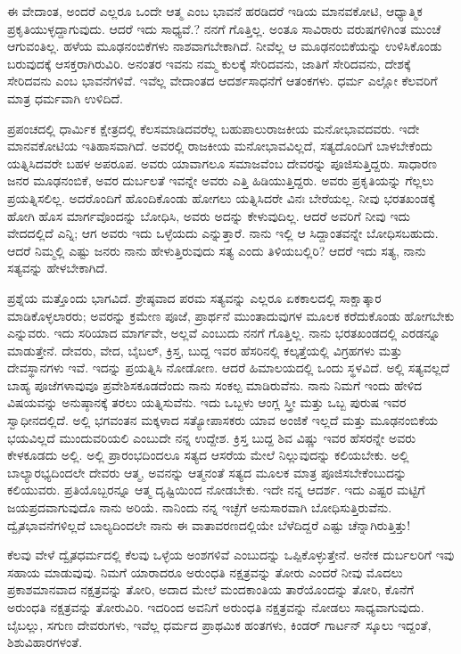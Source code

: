 ಈ ವೇದಾಂತ, ಅಂದರೆ ಎಲ್ಲರೂ ಒಂದೇ ಆತ್ಮ ಎಂಬ ಭಾವನೆ ಹರಡಿದರೆ ಇಡಿಯ ಮಾನವಕೋಟಿ, ಆಧ್ಯಾತ್ಮಿಕ ಪ್ರಕೃತಿಯುಳ್ಳದ್ದಾಗುವುದು. ಆದರೆ ಇದು ಸಾಧ್ಯವೆ.? ನನಗೆ ಗೊತ್ತಿಲ್ಲ. ಅಂತೂ ಸಾವಿರಾರು ವರುಷಗಳಿಗಿಂತ ಮುಂಚೆ ಆಗುವಂತಿಲ್ಲ. ಹಳೆಯ ಮೂಢನಂಬಿಕೆಗಳು ನಾಶವಾಗಬೇಕಾಗಿದೆ. ನೀವೆಲ್ಲ ಆ ಮೂಢನಂಬಿಕೆಯನ್ನು ಉಳಿಸಿಕೊಂಡು ಬರುವುದಕ್ಕೆ ಆಸಕ್ತರಾಗಿರುವಿರಿ. ಅನಂತರ ಇವನು ನಮ್ಮ ಕುಲಕ್ಕೆ ಸೇರಿದವನು, ಜಾತಿಗೆ ಸೇರಿದವನು, ದೇಶಕ್ಕೆ ಸೇರಿದವನು ಎಂಬ ಭಾವನೆಗಳಿವೆ. ಇವೆಲ್ಲ ವೇದಾಂತದ ಆದರ್ಶಸಾಧನೆಗೆ ಆತಂಕಗಳು. ಧರ್ಮ ಎಲ್ಲೋ ಕೆಲವರಿಗೆ ಮಾತ್ರ ಧರ್ಮವಾಗಿ ಉಳಿದಿದೆ.

\newpage

ಪ್ರಪಂಚದಲ್ಲಿ ಧಾರ್ಮಿಕ ಕ್ಷೇತ್ರದಲ್ಲಿ ಕೆಲಸಮಾಡಿದವರೆಲ್ಲ ಬಹುಪಾಲು\break ರಾಜಕೀಯ ಮನೋಭಾವದವರು. ಇದೇ ಮಾನವಕೋಟಿಯ ಇತಿಹಾಸವಾಗಿದೆ. ಅವರಲ್ಲಿ ರಾಜಕೀಯ ಮನೋಭಾವವಿಲ್ಲದೆ, ಸತ್ಯದೊಂದಿಗೆ ಬಾಳಬೇಕೆಂದು ಯತ್ನಿಸಿದವರೇ ಬಹಳ ಅಪರೂಪ. ಅವರು ಯಾವಾಗಲೂ ಸಮಾಜವೆಂಬ ದೇವರನ್ನು ಪೂಜಿಸುತ್ತಿದ್ದರು. ಸಾಧಾರಣ ಜನರ ಮೂಢನಂಬಿಕೆ, ಅವರ ದುರ್ಬಲತೆ ಇವನ್ನೇ ಅವರು ಎತ್ತಿ ಹಿಡಿಯುತ್ತಿದ್ದರು. ಅವರು ಪ್ರಕೃತಿಯನ್ನು ಗೆಲ್ಲಲು ಪ್ರಯತ್ನಿಸಲಿಲ್ಲ. ಅದರೊಂದಿಗೆ ಹೊಂದಿಕೊಂಡು ಹೋಗಲು ಯತ್ನಿಸಿದರೇ ವಿನಃ ಬೇರೆಯಲ್ಲ. ನೀವು ಭರತಖಂಡಕ್ಕೆ ಹೋಗಿ ಹೊಸ ಮಾರ್ಗವೊಂದನ್ನು ಬೋಧಿಸಿ, ಅವರು ಅದನ್ನು ಕೇಳುವುದಿಲ್ಲ. ಆದರೆ ಅವರಿಗೆ ನೀವು ಇದು ವೇದದಲ್ಲಿದೆ ಎನ್ನಿ; ಆಗ ಅವರು ಇದು ಒಳ್ಳೆಯದು ಎನ್ನುತ್ತಾರೆ. ನಾನು ಇಲ್ಲಿ ಆ ಸಿದ್ದಾಂತವನ್ನೇ ಬೋಧಿಸಬಹುದು. ಆದರೆ ನಿಮ್ಮಲ್ಲಿ ಎಷ್ಟು ಜನರು ನಾನು ಹೇಳುತ್ತಿರುವುದು ಸತ್ಯ ಎಂದು ತಿಳಿಯಬಲ್ಲಿರಿ? ಆದರೆ ಇದು ಸತ್ಯ, ನಾನು ಸತ್ಯವನ್ನು ಹೇಳಬೇಕಾಗಿದೆ.

ಪ್ರಶ್ನೆಯ ಮತ್ತೊಂದು ಭಾಗವಿದೆ. ಶ್ರೇಷ್ಠವಾದ ಪರಮ ಸತ್ಯವನ್ನು ಎಲ್ಲರೂ ಏಕಕಾಲದಲ್ಲಿ ಸಾಕ್ಷಾತ್ಕಾರ ಮಾಡಿಕೊಳ್ಳಲಾರರು; ಅವರನ್ನು ಕ್ರಮೇಣ ಪೂಜೆ, ಪ್ರಾರ್ಥನೆ ಮುಂತಾದುವುಗಳ ಮೂಲಕ ಕರೆದುಕೊಂಡು ಹೋಗಬೇಕು ಎನ್ನುವರು. ಇದು ಸರಿಯಾದ ಮಾರ್ಗವೇ, ಅಲ್ಲವೆ ಎಂಬುದು ನನಗೆ ಗೊತ್ತಿಲ್ಲ. ನಾನು ಭರತಖಂಡದಲ್ಲಿ ಎರಡನ್ನೂ ಮಾಡುತ್ತೇನೆ. ದೇವರು, ವೇದ, ಬೈಬಲ್, ಕ್ರಿಸ್ತ, ಬುದ್ದ ಇವರ ಹೆಸರಿನಲ್ಲಿ ಕಲ್ಕತ್ತೆಯಲ್ಲಿ ವಿಗ್ರಹಗಳು ಮತ್ತು ದೇವಸ್ಥಾನಗಳು ಇವೆ. ಇದನ್ನು ಪ್ರಯತ್ನಿಸಿ ನೋಡೋಣ. ಆದರೆ ಹಿಮಾಲಯದಲ್ಲಿ ಒಂದು ಸ್ಥಳವಿದೆ. ಅಲ್ಲಿ ಸತ್ಯವಲ್ಲದೆ ಬಾಹ್ಯ ಪೂಜೆಗಳಾವುವೂ ಪ್ರವೇಶಿಸಕೂಡದೆಂದು ನಾನು ಸಂಕಲ್ಪ ಮಾಡಿರುವೆನು. ನಾನು ನಿಮಗೆ ಇಂದು ಹೇಳಿದ ವಿಷಯವನ್ನು ಅನುಷ್ಠಾನಕ್ಕೆ ತರಲು ಯತ್ನಿಸುವೆನು. ಇದು ಒಬ್ಬಳು ಆಂಗ್ಲ ಸ್ತ್ರೀ ಮತ್ತು ಒಬ್ಬ ಪುರುಷ ಇವರ ಸ್ವಾಧೀನದಲ್ಲಿದೆ. ಅಲ್ಲಿ ಭಗವಂತನ ಮಕ್ಕಳಾದ ಸತ್ಯೋಪಾಸಕರು ಯಾವ ಅಂಜಿಕೆ ಇಲ್ಲದೆ ಮತ್ತು ಮೂಢನಂಬಿಕೆಯ ಭಯವಿಲ್ಲದೆ ಮುಂದುವರಿಯಲಿ ಎಂಬುದೇ ನನ್ನ ಉದ್ದೇಶ. ಕ್ರಿಸ್ತ ಬುದ್ದ ಶಿವ ವಿಷ್ಣು ಇವರ ಹೆಸರನ್ನೇ ಅವರು ಕೇಳಕೂಡದು ಅಲ್ಲಿ. ಅಲ್ಲಿ ಪ್ರಾರಂಭದಿಂದಲೂ ಸತ್ಯದ ಆಸರೆಯ ಮೇಲೆ ನಿಲ್ಲುವುದನ್ನು ಕಲಿಯಬೇಕು. ಅಲ್ಲಿ ಬಾಲ್ಯಾರಭ್ಯದಿಂದಲೇ ದೇವರು ಆತ್ಮ, ಅವನನ್ನು ಆತ್ಮನಂತೆ ಸತ್ಯದ ಮೂಲಕ ಮಾತ್ರ ಪೂಜಿಸಬೇಕೆಂಬುದನ್ನು ಕಲಿಯುವರು. ಪ್ರತಿಯೊಬ್ಬರನ್ನೂ ಆತ್ಮ ದೃಷ್ಟಿಯಿಂದ ನೋಡಬೇಕು. ಇದೇ ನನ್ನ ಆದರ್ಶ. ಇದು ಎಷ್ಟರ ಮಟ್ಟಿಗೆ ಜಯಪ್ರದವಾಗುವುದೊ ನಾನು ಅರಿಯೆ. ನಾನಿಂದು ನನ್ನ ಇಚ್ಛೆಗೆ ಅನುಸಾರವಾಗಿ ಬೋಧಿಸುತ್ತಿರುವೆನು. ದ್ವೈತಭಾವನೆಗಳಿಲ್ಲದೆ ಬಾಲ್ಯದಿಂದಲೇ ನಾನು ಈ ವಾತಾವರಣದಲ್ಲಿಯೇ ಬೆಳೆದಿದ್ದರೆ ಎಷ್ಟು ಚೆನ್ನಾಗಿರುತ್ತಿತ್ತು!

\newpage

ಕೆಲವು ವೇಳೆ ದ್ವೈತಧರ್ಮದಲ್ಲಿ ಕೆಲವು ಒಳ್ಳೆಯ ಅಂಶಗಳಿವೆ ಎಂಬುದನ್ನು ಒಪ್ಪಿಕೊಳ್ಳುತ್ತೇನೆ. ಅನೇಕ ದುರ್ಬಲರಿಗೆ ಇವು ಸಹಾಯ ಮಾಡುವುವು. ನಿಮಗೆ ಯಾರಾದರೂ ಅರುಂಧತಿ ನಕ್ಷತ್ರವನ್ನು ತೋರು ಎಂದರೆ ನೀವು ಮೊದಲು ಪ್ರಕಾಶಮಾನವಾದ ನಕ್ಷತ್ರವನ್ನು ತೋರಿ, ಅದಾದ ಮೇಲೆ ಮಂದಕಾಂತಿಯ ತಾರೆಯೊಂದನ್ನು ತೋರಿ, ಕೊನೆಗೆ ಅರುಂಧತಿ ನಕ್ಷತ್ರವನ್ನು ತೋರುವಿರಿ. ಇದರಿಂದ ಅವನಿಗೆ ಅರುಂಧತಿ ನಕ್ಷತ್ರವನ್ನು ನೋಡಲು ಸಾಧ್ಯವಾಗುವುದು. ಬೈಬಲ್ಲು, ಸಗುಣ ದೇವರುಗಳು, ಇವೆಲ್ಲ ಧರ್ಮದ ಪ್ರಾಥಮಿಕ ಹಂತಗಳು, ಕಿಂಡರ್ ಗಾರ್ಟನ್ ಸ್ಕೂಲು ಇದ್ದಂತೆ, ಶಿಶುವಿಹಾರಗಳಂತೆ.

